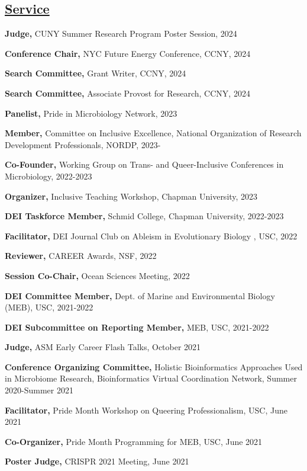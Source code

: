 \documentclass[]{res}
\begin{document}
\begin{resume}
\section{\underline{Service}} \vspace{2mm}

{\bf Judge,} CUNY Summer Research Program Poster Session, 2024

{\bf Conference Chair,} NYC Future Energy Conference, CCNY, 2024

{\bf Search Committee,} Grant Writer, CCNY, 2024

{\bf Search Committee,} Associate Provost for Research, CCNY, 2024

{\bf Panelist,} Pride in Microbiology Network, 2023

{\bf Member,} Committee on Inclusive Excellence, National Organization of Research Development Professionals, NORDP, 2023-

{\bf Co-Founder,} Working Group on Trans- and Queer-Inclusive Conferences in Microbiology, 2022-2023

{\bf Organizer,} {Inclusive Teaching Workshop}, Chapman University, 2023

{\bf DEI Taskforce Member,} {Schmid College}, Chapman University, 2022-2023

{\bf Facilitator,} DEI Journal Club on Ableism in Evolutionary Biology , USC, 2022

{\bf Reviewer,} CAREER Awards, NSF, 2022

{\bf Session Co-Chair,} {Ocean Sciences Meeting}, 2022

{\bf DEI Committee Member,} {Dept. of Marine and Environmental Biology (MEB)}, USC, 2021-2022

{\bf DEI Subcommittee on Reporting Member,} {MEB}, USC, 2021-2022

{\bf Judge,} ASM Early Career Flash Talks, October 2021

{\bf Conference Organizing Committee,} {Holistic Bioinformatics Approaches Used in Microbiome Research}, Bioinformatics Virtual Coordination Network, Summer 2020-Summer 2021

{\bf Facilitator,} {Pride Month Workshop on Queering Professionalism}, USC, June 2021

{\bf Co-Organizer,} {Pride Month Programming for MEB}, USC, June 2021


{\bf Poster Judge,} {CRISPR 2021 Meeting}, June 2021


\end{resume}
\end{document}
